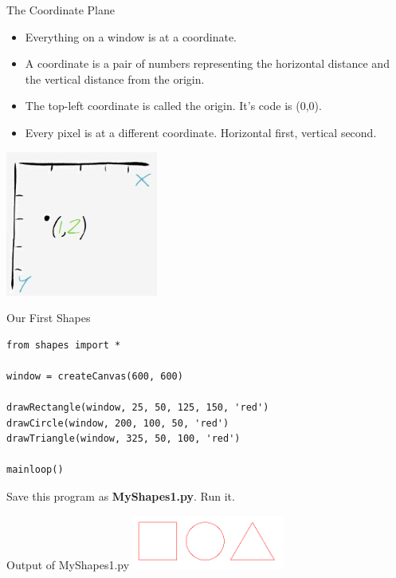 \documentclass{beamer}
\begin{document}
\begin{frame}{The Coordinate Plane}

\begin{itemize}
\item Everything on a window is at a coordinate.
\item A coordinate is a pair of numbers representing the horizontal distance and the vertical distance from the origin.
\item The top-left coordinate is called the origin. It's code is (0,0).
\item Every pixel is at a different coordinate. Horizontal first, vertical second.
\end{itemize}

\includegraphics[width=50mm]{images/xyFlippedPlane.jpg}
\end{frame}

\begin{frame}[fragile]{Our First Shapes}

\begin{verbatim}
from shapes import *

window = createCanvas(600, 600)

drawRectangle(window, 25, 50, 125, 150, 'red')
drawCircle(window, 200, 100, 50, 'red')
drawTriangle(window, 325, 50, 100, 'red')

mainloop()
\end{verbatim}


Save this program as \textbf{MyShapes1.py}. Run it.

\end{frame}

\begin{frame}{Output of MyShapes1.py}
\includegraphics[width=50mm]{images/squareCircleTriangle.png}
\end{frame}
\end{document}
